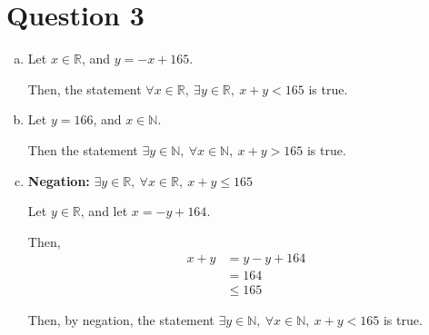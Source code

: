 \documentclass[12pt]{article}
\begin{document}
\section*{Question 3}
\begin{enumerate}[a.]
    \item

    Let $x \in \mathbb{R}$, and $y = -x + 165$.

    \bigskip

    Then, the statement $\forall x \in \mathbb{R},\: \exists y \in \mathbb{R},\:
    x + y < 165$ is true.

    \item

    Let $y = 166$, and $x \in \mathbb{N}$.

    \bigskip

    Then the statement $\exists y \in \mathbb{N},\:\forall x \in \mathbb{N},\:
    x+y >165$ is true.

    \item

    \textbf{Negation:} $\exists y \in \mathbb{R},\:\forall x \in \mathbb{R},\:
    x+y\leq 165$

    \bigskip

    Let $y \in \mathbb{R}$, and let $x = -y + 164$.

    \bigskip

    Then,
    \setcounter{equation}{0}
    \begin{align}
        x + y &= y - y + 164\\
        &= 164\\
        & \leq 165
    \end{align}

    \bigskip

    Then, by negation, the statement $\exists y \in \mathbb{N},\:\forall x \in
    \mathbb{N},\:x+y < 165$ is true.


\end{enumerate}
\end{document}
